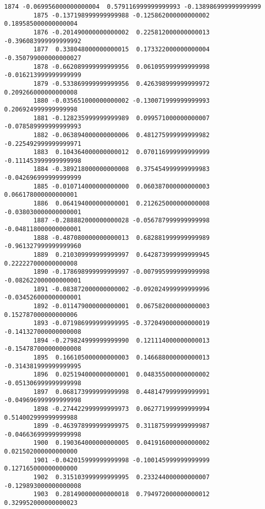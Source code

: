 \documentclass[11pt]{article}
\begin{document}
\begin{Verbatim}[commandchars=\\\{\}]
        1874 -0.069956000000000004  0.579116999999999993 -0.138986999999999999   
        1875 -0.137198999999999988 -0.125862000000000002  0.189585000000000004   
        1876 -0.201490000000000002  0.225812000000000013 -0.396083999999999992   
        1877  0.338048000000000015  0.173322000000000004 -0.350799000000000027   
        1878 -0.662089999999999956  0.061095999999999998 -0.016213999999999999   
        1879 -0.533869999999999956  0.426398999999999972  0.209266000000000008   
        1880 -0.035651000000000002 -0.130071999999999993  0.206924999999999998   
        1881 -0.128235999999999989  0.099571000000000007 -0.078589999999999993   
        1882 -0.063894000000000006  0.481275999999999982 -0.225492999999999971   
        1883  0.104364000000000012  0.070116999999999999 -0.111453999999999998   
        1884 -0.389218000000000008  0.375454999999999983 -0.042696999999999999   
        1885 -0.010714000000000000  0.060387000000000003  0.066178000000000001   
        1886  0.064194000000000001  0.212625000000000008 -0.038030000000000001   
        1887 -0.288882000000000028 -0.056787999999999998 -0.048118000000000001   
        1888 -0.487080000000000013  0.682881999999999989 -0.961327999999999960   
        1889  0.210309999999999997  0.642873999999999945  0.222227000000000008   
        1890 -0.178698999999999997 -0.007995999999999998 -0.082622000000000001   
        1891 -0.083872000000000002 -0.092024999999999996 -0.034526000000000001   
        1892 -0.011479000000000001  0.067582000000000003  0.152787000000000006   
        1893 -0.071986999999999995 -0.372049000000000019 -0.141327000000000008   
        1894 -0.279824999999999990  0.121114000000000013 -0.154787000000000008   
        1895  0.166105000000000003  0.146688000000000013 -0.314381999999999995   
        1896  0.025194000000000001  0.048355000000000002 -0.051306999999999998   
        1897  0.068173999999999998  0.448147999999999991 -0.049696999999999998   
        1898 -0.274422999999999973  0.062771999999999994  0.514002999999999988   
        1899 -0.463978999999999975  0.311875999999999987 -0.046636999999999998   
        1900  0.190364000000000005  0.041916000000000002  0.021502000000000000   
        1901 -0.042015999999999998 -0.100145999999999999  0.127165000000000000   
        1902  0.315103999999999995  0.233244000000000007 -0.129893000000000008   
        1903  0.281490000000000018  0.794972000000000012  0.329952000000000023   
        

\end{Verbatim}
\end{document}
